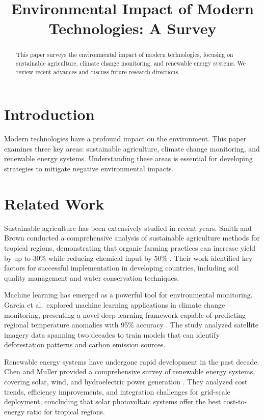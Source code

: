 \documentclass[conference]{IEEEtran}
\title{Environmental Impact of Modern Technologies: A Survey}
\author{%
  \IEEEauthorblockN{Jane Doe}
  \IEEEauthorblockA{Department of Environmental Science\\
    University of Example\\
    example@university.edu}
  \and
  \IEEEauthorblockN{Bob Example}
  \IEEEauthorblockA{Institute of Technology\\
    Tech University\\
    bob@techuniversity.edu}
}
\begin{document}
\maketitle

\begin{abstract}
This paper surveys the environmental impact of modern technologies,
focusing on sustainable agriculture, climate change monitoring, and
renewable energy systems. We review recent advances and discuss future
research directions.
\end{abstract}

\section{Introduction}

Modern technologies have a profound impact on the environment. This paper
examines three key areas: sustainable agriculture, climate change
monitoring, and renewable energy systems. Understanding these areas is
essential for developing strategies to mitigate negative environmental
impacts.

\blindtext

\section{Related Work}

Sustainable agriculture has been extensively studied in recent years.
Smith and Brown conducted a comprehensive analysis of sustainable
agriculture methods for tropical regions, demonstrating that organic
farming practices can increase yield by up to 30\% while reducing
chemical input by 50\% \cite{Smith2021}.
Their work identified key factors for successful implementation in
developing countries, including soil quality management and water
conservation techniques.

Machine learning has emerged as a powerful tool for environmental
monitoring. Garcia et al.\ explored machine learning applications in
climate change monitoring, presenting a novel deep learning framework
capable of predicting regional temperature anomalies with 95\%
accuracy \cite{Garcia2022}.
The study analyzed satellite imagery data spanning two decades to train
models that can identify deforestation patterns and carbon emission sources.

Renewable energy systems have undergone rapid development in the past
decade. Chen and Muller provided a comprehensive survey of renewable
energy systems, covering solar, wind, and hydroelectric power
generation \cite{Chen2023}.
They analyzed cost trends, efficiency improvements, and integration
challenges for grid-scale deployment, concluding that solar photovoltaic
systems offer the best cost-to-energy ratio for tropical regions.
\end{document}
